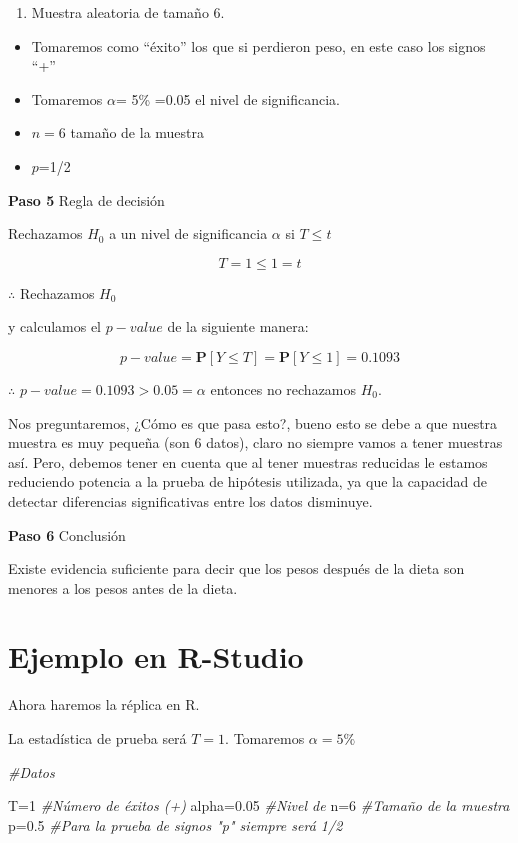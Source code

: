 \documentclass[
  a4paper,
  oneside,
  openany]{book}
\newenvironment{Shaded}{\begin{snugshade}}{\end{snugshade}}
\newcommand{\CommentTok}[1]{\textcolor[rgb]{0.56,0.35,0.01}{\textit{#1}}}
\newcommand{\DecValTok}[1]{\textcolor[rgb]{0.00,0.00,0.81}{#1}}
\newcommand{\FloatTok}[1]{\textcolor[rgb]{0.00,0.00,0.81}{#1}}
\newcommand{\NormalTok}[1]{#1}
\providecommand{\tightlist}{%
  \setlength{\itemsep}{0pt}\setlength{\parskip}{0pt}}
\begin{document}
\begin{enumerate}
\def\labelenumi{\arabic{enumi}.}
\tightlist
\item
  Muestra aleatoria de tamaño 6.
\end{enumerate}

\begin{itemize}
\item
  Tomaremos como ``éxito'' los que si perdieron peso, en este caso los signos ``+''
\item
  Tomaremos \(\alpha\)= 5\% =0.05 el nivel de significancia.
\item
  \(n=6\) tamaño de la muestra
\item
  \(p\)=1/2
\end{itemize}

\textbf{Paso 5} Regla de decisión

Rechazamos \(H_0\) a un nivel de significancia \(\alpha\) si \(T \leq t\)

\[T=1 \leq 1=t\]

\(\therefore\) Rechazamos \(H_0\)

y calculamos el \(p-value\) de la siguiente manera:

\[p-value=\mathbf{P}[Y\leq T]=\mathbf{P}[Y\leq 1]=0.1093\]

\(\therefore\) \(p-value=0.1093>0.05=\alpha\) entonces no rechazamos \(H_0\).

Nos preguntaremos, ¿Cómo es que pasa esto?, bueno esto se debe a que nuestra muestra es muy pequeña (son 6 datos), claro no siempre vamos a tener muestras así. Pero, debemos tener en cuenta que al tener muestras reducidas le estamos reduciendo potencia a la prueba de hipótesis utilizada, ya que la capacidad de detectar diferencias significativas entre los datos disminuye.

\textbf{Paso 6} Conclusión

Existe evidencia suficiente para decir que los pesos después de la dieta son menores a los pesos antes de la dieta.

\hypertarget{ejemplo-en-r-studio-2}{%
\section{Ejemplo en R-Studio}\label{ejemplo-en-r-studio-2}}

Ahora haremos la réplica en R.

La estadística de prueba será \(T=1\). Tomaremos \(\alpha=5\%\)

\begin{Shaded}
\begin{Highlighting}[]
\CommentTok{\#Datos}

\NormalTok{T=}\DecValTok{1}              \CommentTok{\#Número de éxitos (+)}
\NormalTok{alpha=}\FloatTok{0.05}       \CommentTok{\#Nivel de }
\NormalTok{n=}\DecValTok{6}              \CommentTok{\#Tamaño de la muestra }
\NormalTok{p=}\FloatTok{0.5}            \CommentTok{\#Para la prueba de signos "p" siempre será 1/2}
\end{Highlighting}
\end{Shaded}
\end{document}
